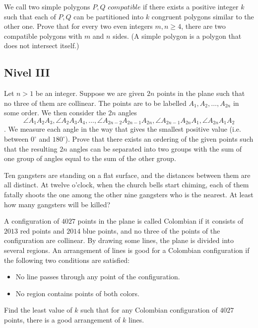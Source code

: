 \documentclass[11pt]{scrartcl}
\begin{document}
\begin{problem} 
    We call two simple polygons $P, Q$ $\textit{compatible}$ if there exists a positive integer $k$ such that each of $P, Q$ can be partitioned into $k$ congruent polygons similar to the other one. Prove that for every two even integers $m, n \geq 4$, there are two compatible polygons with $m$ and $n$ sides. (A simple polygon is a polygon that does not intersect itself.)
\end{problem}

\subsection{Nivel III}
\begin{problem} 
    Let $n>1$ be an integer. Suppose we are given $2n$ points in the plane such that no three of them are collinear. The points are to be labelled $A_1, A_2, \dots , A_{2n}$ in some order. We then consider the $2n$ angles $$\angle A_1A_2A_3, \angle A_2A_3A_4, \dots , \angle A_{2n-2}A_{2n-1}A_{2n}, \angle A_{2n-1}A_{2n}A_1, \angle A_{2n}A_1A_2$$. We measure each angle in the way that gives the smallest positive value (i.e. between $0^{\circ}$ and $180^{\circ}$). Prove that there exists an ordering of the given points such that the resulting $2n$ angles can be separated into two groups with the sum of one group of angles equal to the sum of the other group.
\end{problem}

\begin{problem} 
    Ten gangsters are standing on a flat surface, and the distances between them are all distinct. At twelve o’clock, when the church bells start chiming, each of them fatally shoots the one among the other nine gangsters who is the nearest. At least how many gangsters will be killed?
\end{problem}

\begin{problem} [IMO 2013/2]
    A configuration of $4027$ points in the plane is called Colombian if it consists of $2013$ red points and $2014$ blue points, and no three of the points of the configuration are collinear. By drawing some lines, the plane is divided into several regions. An arrangement of lines is good for a Colombian configuration if the following two conditions are satisfied:
\begin{itemize}
\item No line passes through any point of the configuration.

\item No region contains points of both colors.
\end{itemize}
Find the least value of $k$ such that for any Colombian configuration of $4027$ points, there is a good arrangement of $k$ lines.
\end{problem}
\end{document}
